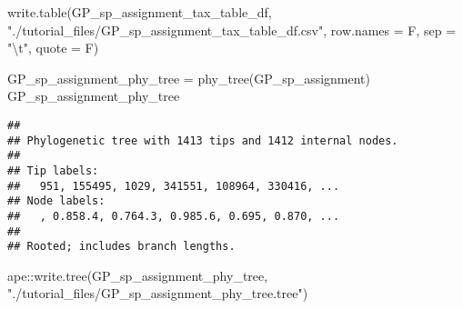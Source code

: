 \documentclass[
]{article}
\newenvironment{Shaded}{\begin{snugshade}}{\end{snugshade}}
\newcommand{\AttributeTok}[1]{\textcolor[rgb]{0.77,0.63,0.00}{#1}}
\newcommand{\FunctionTok}[1]{\textcolor[rgb]{0.00,0.00,0.00}{#1}}
\newcommand{\NormalTok}[1]{#1}
\newcommand{\OtherTok}[1]{\textcolor[rgb]{0.56,0.35,0.01}{#1}}
\newcommand{\SpecialCharTok}[1]{\textcolor[rgb]{0.00,0.00,0.00}{#1}}
\newcommand{\StringTok}[1]{\textcolor[rgb]{0.31,0.60,0.02}{#1}}
\begin{document}
\begin{Shaded}
\begin{Highlighting}[]
\FunctionTok{write.table}\NormalTok{(GP\_sp\_assignment\_tax\_table\_df, }\StringTok{"./tutorial\_files/GP\_sp\_assignment\_tax\_table\_df.csv"}\NormalTok{,}
            \AttributeTok{row.names =}\NormalTok{ F,}
            \AttributeTok{sep =} \StringTok{"}\SpecialCharTok{\textbackslash{}t}\StringTok{"}\NormalTok{,}
            \AttributeTok{quote =}\NormalTok{ F)}
\end{Highlighting}
\end{Shaded}

\begin{Shaded}
\begin{Highlighting}[]
\NormalTok{GP\_sp\_assignment\_phy\_tree }\OtherTok{=} \FunctionTok{phy\_tree}\NormalTok{(GP\_sp\_assignment)}
\NormalTok{GP\_sp\_assignment\_phy\_tree}
\end{Highlighting}
\end{Shaded}

\begin{verbatim}
## 
## Phylogenetic tree with 1413 tips and 1412 internal nodes.
## 
## Tip labels:
##   951, 155495, 1029, 341551, 108964, 330416, ...
## Node labels:
##   , 0.858.4, 0.764.3, 0.985.6, 0.695, 0.870, ...
## 
## Rooted; includes branch lengths.
\end{verbatim}

\begin{Shaded}
\begin{Highlighting}[]
\NormalTok{ape}\SpecialCharTok{::}\FunctionTok{write.tree}\NormalTok{(GP\_sp\_assignment\_phy\_tree, }\StringTok{"./tutorial\_files/GP\_sp\_assignment\_phy\_tree.tree"}\NormalTok{)}
\end{Highlighting}
\end{Shaded}
\end{document}
